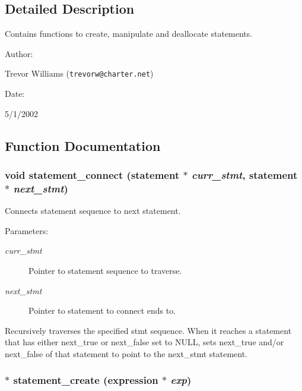 \subsection{Detailed Description}
Contains functions to create, manipulate and deallocate statements.



\begin{Desc}
\item[Author: ]\par
Trevor Williams ({\tt trevorw@charter.net}) \end{Desc}
\begin{Desc}
\item[Date: ]\par
5/1/2002\end{Desc}


\subsection{Function Documentation}
\subsubsection{\setlength{\rightskip}{0pt plus 5cm}void statement\_\-connect ({\bf statement} $\ast$ {\em curr\_\-stmt}, {\bf statement} $\ast$ {\em next\_\-stmt})}\label{statement_8h_a3}


Connects statement sequence to next statement.

\begin{Desc}
\item[Parameters: ]\par
\begin{description}
\item[{\em 
curr\_\-stmt}]Pointer to statement sequence to traverse. \item[{\em 
next\_\-stmt}]Pointer to statement to connect ends to.\end{description}
\end{Desc}
Recursively traverses the specified stmt sequence. When it reaches a statement  that has either next\_\-true or next\_\-false set to NULL, sets next\_\-true and/or  next\_\-false of that statement to point to the next\_\-stmt statement. 
\subsubsection{$\ast$ statement\_\-create ({\bf expression} $\ast$ {\em exp})}\label{statement_8h_a0}


